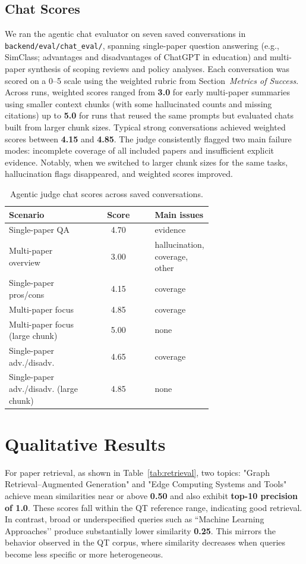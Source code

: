 \documentclass{article}
\begin{document}
\subsection{Chat Scores}
We ran the agentic chat evaluator on seven saved conversations in \texttt{backend/eval/chat\_eval/}, spanning single-paper question answering (e.g., SimClass; advantages and disadvantages of ChatGPT in education) and multi-paper synthesis of scoping reviews and policy analyses. Each conversation was scored on a 0--5 scale using the weighted rubric from Section~\textit{Metrics of Success}. Across runs, weighted scores ranged from \textbf{3.0} for early multi-paper summaries using smaller context chunks (with some hallucinated counts and missing citations) up to \textbf{5.0} for runs that reused the same prompts but evaluated chats built from larger chunk sizes. Typical strong conversations achieved weighted scores between \textbf{4.15} and \textbf{4.85}. The judge consistently flagged two main failure modes: incomplete coverage of all included papers and insufficient explicit evidence. Notably, when we switched to larger chunk sizes for the same tasks, hallucination flags disappeared, and weighted scores improved.

\begin{table}[h]
\centering
\small
\begin{tabular}{p{0.4\linewidth} c p{0.28\linewidth}}
\textbf{Scenario} & \textbf{Score} & \textbf{Main issues} \\\hline
Single-paper QA                    & 4.70 & evidence \\
Multi-paper overview  & 3.00 & hallucination, coverage, other \\
Single-paper pros/cons             & 4.15 & coverage \\
Multi-paper focus      & 4.85 & coverage \\
Multi-paper focus (large chunk)      & 5.00 & none \\
Single-paper adv./disadv. & 4.65 & coverage \\
Single-paper adv./disadv. (large chunk)  & 4.85 & none \\
\end{tabular}
\caption{\label{tab:chat-scores}Agentic judge chat scores across saved conversations.}
\end{table}

\section{Qualitative Results}
For paper retrieval, as shown in Table~\ref{tab:retrieval}, two topics: "Graph Retrieval--Augmented Generation" and "Edge Computing Systems and Tools" achieve mean similarities near or above \textbf{0.50} and also exhibit \textbf{top-10 precision of 1.0}. These scores fall within the QT reference range, indicating good retrieval. In contrast, broad or underspecified queries such as ``Machine Learning Approaches’’ produce substantially lower similarity \textbf{0.25}. This mirrors the behavior observed in the QT corpus, where similarity decreases when queries become less specific or more heterogeneous. 
\end{document}
